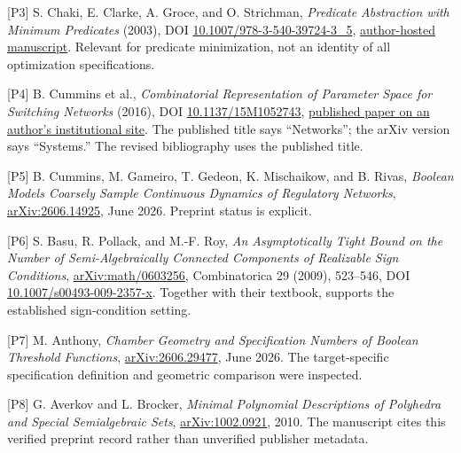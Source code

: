\documentclass[
  11pt,
]{article}
\begin{document}
{[}P3{]} S. Chaki, E. Clarke, A. Groce, and O. Strichman,
\emph{Predicate Abstraction with Minimum Predicates} (2003), DOI
\href{https://doi.org/10.1007/978-3-540-39724-3_5}{10.1007/978-3-540-39724-3\_5},
\href{https://agroce.github.io/charme03.pdf}{author-hosted manuscript}.
Relevant for predicate minimization, not an identity of all optimization
specifications.

{[}P4{]} B. Cummins et al., \emph{Combinatorial Representation of
Parameter Space for Switching Networks} (2016), DOI
\href{https://doi.org/10.1137/15M1052743}{10.1137/15M1052743},
\href{https://chomp.rutgers.edu/papers/DSGRN_paper.pdf}{published paper
on an author's institutional site}. The published title says
``Networks''; the arXiv version says ``Systems.'' The revised
bibliography uses the published title.

{[}P5{]} B. Cummins, M. Gameiro, T. Gedeon, K. Mischaikow, and B. Rivas,
\emph{Boolean Models Coarsely Sample Continuous Dynamics of Regulatory
Networks}, \href{https://arxiv.org/abs/2606.14925}{arXiv:2606.14925},
June 2026. Preprint status is explicit.

{[}P6{]} S. Basu, R. Pollack, and M.-F. Roy, \emph{An Asymptotically
Tight Bound on the Number of Semi-Algebraically Connected Components of
Realizable Sign Conditions},
\href{https://arxiv.org/abs/math/0603256}{arXiv:math/0603256},
Combinatorica 29 (2009), 523--546, DOI
\href{https://doi.org/10.1007/s00493-009-2357-x}{10.1007/s00493-009-2357-x}.
Together with their textbook, supports the established sign-condition
setting.

{[}P7{]} M. Anthony, \emph{Chamber Geometry and Specification Numbers of
Boolean Threshold Functions},
\href{https://arxiv.org/abs/2606.29477}{arXiv:2606.29477}, June 2026.
The target-specific specification definition and geometric comparison
were inspected.

{[}P8{]} G. Averkov and L. Brocker, \emph{Minimal Polynomial
Descriptions of Polyhedra and Special Semialgebraic Sets},
\href{https://arxiv.org/abs/1002.0921}{arXiv:1002.0921}, 2010. The
manuscript cites this verified preprint record rather than unverified
publisher metadata.
\end{document}
